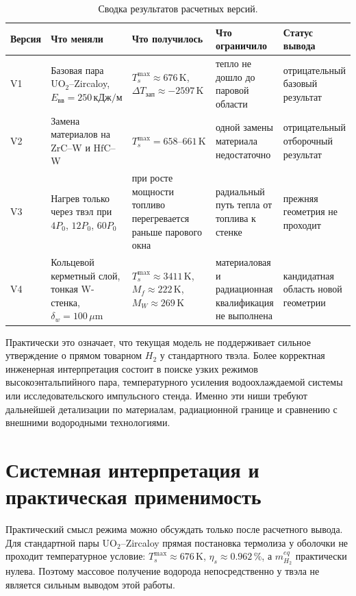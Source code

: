 \documentclass[12pt]{article}
\begin{document}
\begin{table}[H]
    \centering
    \small
    \caption{Сводка результатов расчетных версий.}
    \label{tab:provenSummary}
    \begin{tabularx}{\textwidth}{@{}p{}X X X X@{}}
        \toprule
        Версия & Что меняли & Что получилось & Что ограничило & Статус вывода\\
        \midrule
        V1 & Базовая пара \(\mathrm{UO_2}\)--Zircaloy, \(E_{\mathrm{вв}}=250\,\mathrm{кДж/м}\) & \(T_s^{\max}\approx676\,\mathrm{K}\), \(\Delta T_{\mathrm{зап}}\approx-2597\,\mathrm{K}\) & тепло не дошло до паровой области & отрицательный базовый результат\\
        V2 & Замена материалов на \(\mathrm{ZrC}\)--W и \(\mathrm{HfC}\)--W & \(T_s^{\max}=658\text{--}661\,\mathrm{K}\) & одной замены материала недостаточно & отрицательный отборочный результат\\
        V3 & Нагрев только через твэл при \(4P_0\), \(12P_0\), \(60P_0\) & при росте мощности топливо перегревается раньше парового окна & радиальный путь тепла от топлива к стенке & прежняя геометрия не проходит\\
        V4 & Кольцевой керметный слой, тонкая W-стенка, \(\delta_w=100\,\mu\mathrm{m}\) & \(T_s^{\max}\approx3411\,\mathrm{K}\), \(M_f\approx222\,\mathrm{K}\), \(M_W\approx269\,\mathrm{K}\) & материаловая и радиационная квалификация не выполнена & кандидатная область новой геометрии\\
        \bottomrule
    \end{tabularx}
\end{table}

Практически это означает, что текущая модель не поддерживает сильное утверждение о прямом товарном \(H_2\) у стандартного твэла. Более корректная инженерная интерпретация состоит в поиске узких режимов высокоэнтальпийного пара, температурного усиления водоохлаждаемой системы или исследовательского импульсного стенда. Именно эти ниши требуют дальнейшей детализации по материалам, радиационной границе и сравнению с внешними водородными технологиями.

\section{Системная интерпретация и практическая применимость}

Практический смысл режима можно обсуждать только после расчетного вывода. Для стандартной пары \(\mathrm{UO_2}\)--Zircaloy прямая постановка термолиза у оболочки не проходит температурное условие: \(T_s^{\max}\approx676\,\mathrm{K}\), \(\eta_s\approx0.962\,\%\), а \(m_{H_2}^{eq}\) практически нулева. Поэтому массовое получение водорода непосредственно у твэла не является сильным выводом этой работы.
\end{document}
